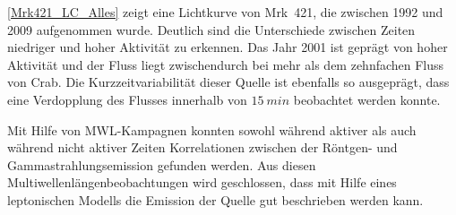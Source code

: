\autoref{Mrk421_LC_Alles} zeigt eine Lichtkurve von Mrk~421, die zwischen 1992 und 2009 aufgenommen wurde.
Deutlich sind die Unterschiede zwischen Zeiten niedriger und hoher Aktivität zu erkennen. 
Das Jahr 2001 ist geprägt von hoher Aktivität und der Fluss liegt zwischendurch bei mehr als dem zehnfachen Fluss von Crab.\cite{Mrk421_LC_lang}
Die Kurzzeitvariabilität dieser Quelle ist ebenfalls so ausgeprägt, dass eine Verdopplung des Flusses innerhalb von $\SI{15}{min}$ beobachtet werden konnte.\cite{Weekes}

Mit Hilfe von MWL-Kampagnen konnten sowohl während aktiver als auch während nicht aktiver Zeiten Korrelationen zwischen der Röntgen- und Gammastrahlungsemission gefunden werden.
Aus diesen Multiwellenlängenbeobachtungen wird geschlossen, dass mit Hilfe eines leptonischen Modells die Emission der Quelle gut beschrieben werden kann.\cite{MWL2009}


% 
% 
